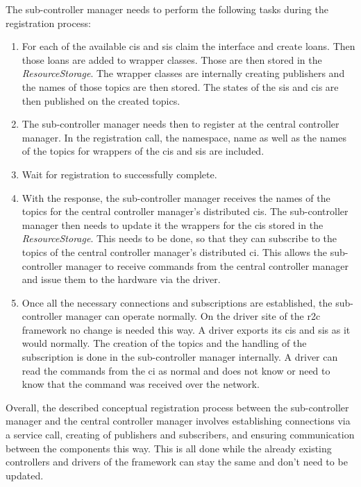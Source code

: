 The sub-controller manager needs to perform the following tasks during the registration process:
\begin{enumerate}
    \item For each of the available \glspl{ci} and \glspl{si} claim the interface and create loans. Then those loans are added to wrapper classes.  Those are then stored in the \textit{ResourceStorage}. The wrapper classes are internally creating publishers and the names of those topics are then stored. The states of the \glspl{si} and \glspl{ci} are then published on the created topics.

    \item The sub-controller manager needs then to register at the central controller manager. In the registration call, the namespace, name as well as the names of the topics for wrappers of the \glspl{ci} and \glspl{si} are included. 
    
    \item Wait for registration to successfully complete. 
    
    \item With the response, the sub-controller manager receives the names of the topics for the central controller manager's distributed \glspl{ci}. The sub-controller manager then needs to update it the wrappers for the \glspl{ci} stored in the \textit{ResourceStorage}. This needs to be done, so that they can subscribe to the topics of the central controller manager's distributed \gls{ci}. This allows the sub-controller manager to receive commands from the central controller manager and issue them to the hardware via the driver.

    \item Once all the necessary connections and subscriptions are established, the sub-controller manager can operate normally. On the driver site of the \gls{r2c} framework no change is needed this way. A driver exports its \glspl{ci} and \glspl{si} as it would normally. The creation of the topics and the handling of the subscription is done in the sub-controller manager internally. A driver can read the commands from the \gls{ci} as normal and does not know or need to know that the command was received over the network.
    
\end{enumerate}
Overall, the described conceptual registration process between the sub-controller manager and the central controller manager involves establishing connections via a service call, creating of publishers and subscribers, and ensuring communication between the components this way. This is all done while the already existing controllers and drivers of the framework can stay the same and don't need to be updated.

